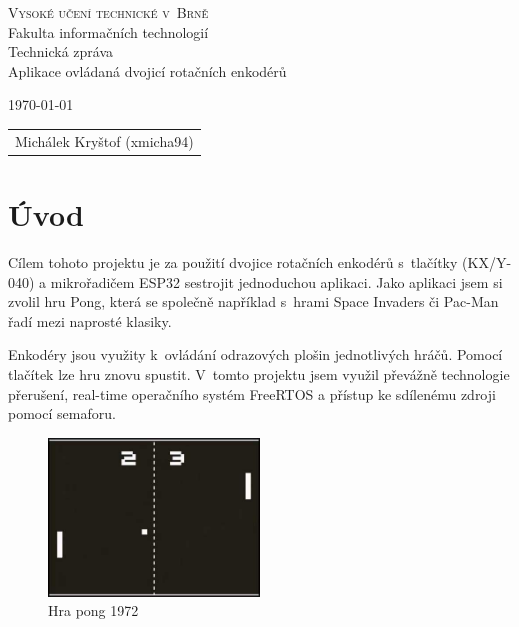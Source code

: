 \documentclass[a4paper,11pt]{article}
\begin{document}
\begin{center}
\Huge
\textsc{Vysoké učení technické v~Brně\\
}Fakulta informačních technologií\\
\Huge Technická zpráva \\
\LARGE  Aplikace ovládaná dvojicí rotačních enkodérů \\

\Large 


\end{center}
{\Large \today \hfill
\begin{tabular}{l}
            Michálek Kryštof (xmicha94)
\end{tabular}}
\thispagestyle{empty}

\newpage
\tableofcontents
\newpage

\section{Úvod}
Cílem tohoto projektu je za použití dvojice rotačních enkodérů s~tlačítky (KX/Y-040) a mikrořadičem ESP32 sestrojit jednoduchou aplikaci. 
Jako aplikaci jsem si zvolil hru Pong, která se společně například s~hrami Space Invaders či Pac-Man řadí mezi naprosté klasiky. 

Enkodéry jsou využity k~ovládání odrazových plošin jednotlivých hráčů. 
Pomocí tlačítek lze hru znovu spustit. 
V~tomto projektu jsem využil převážně technologie přerušení, real-time operačního systém FreeRTOS a přístup ke sdílenému zdroji pomocí semaforu.

\begin{figure}[H]
    \centering
    \includegraphics[width=0.5\textwidth]{obrazky-figures/pong.jpg}
    \caption{Hra pong 1972}
\end{figure}
\end{document}
